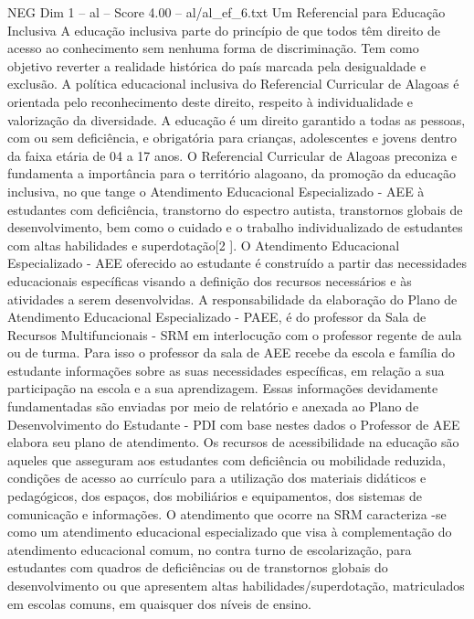 \begin{textsample}{NEG Dim 1 – al – Score 4.00 – al/al\_ef\_6.txt}  \label{ex:f1_neg_133}
Um Referencial para Educação Inclusiva A educação inclusiva parte do princípio de que todos têm direito de acesso ao conhecimento sem nenhuma forma de discriminação.
Tem como objetivo reverter a realidade histórica do país marcada pela desigualdade e exclusão.
A política educacional inclusiva do Referencial Curricular de Alagoas é orientada pelo reconhecimento deste direito, respeito à individualidade e valorização da diversidade.
A educação é um direito garantido a todas as pessoas, com ou sem deficiência, e obrigatória para crianças, adolescentes e jovens dentro da faixa etária de 04 a 17 anos.
O Referencial Curricular de Alagoas preconiza e fundamenta a importância para o território alagoano, da promoção da educação inclusiva, no que tange o Atendimento Educacional Especializado - AEE à estudantes com deficiência, transtorno do espectro autista, transtornos globais de desenvolvimento, bem como o cuidado e o trabalho individualizado de estudantes com altas habilidades e superdotação[2 ].
O Atendimento Educacional Especializado - AEE oferecido ao estudante é construído a partir das necessidades educacionais específicas visando a definição dos recursos necessários e às atividades a serem desenvolvidas.
A responsabilidade da elaboração do Plano de Atendimento Educacional Especializado - PAEE, é do professor da Sala de Recursos Multifuncionais - SRM em interlocução com o professor regente de aula ou de turma.
Para isso o professor da sala de AEE recebe da escola e família do estudante informações sobre as suas necessidades específicas, em relação a sua participação na escola e a sua aprendizagem.
Essas informações devidamente fundamentadas são enviadas por meio de relatório e anexada ao Plano de Desenvolvimento do Estudante - PDI com base nestes dados o Professor de AEE elabora seu plano de atendimento.
Os recursos de acessibilidade na educação são aqueles que asseguram aos estudantes com deficiência ou mobilidade reduzida, condições de acesso ao currículo para a utilização dos materiais didáticos e pedagógicos, dos espaços, dos mobiliários e equipamentos, dos sistemas de comunicação e informações.
O atendimento que ocorre na SRM caracteriza -se como um atendimento educacional especializado que visa à complementação do atendimento educacional comum, no contra turno de escolarização, para estudantes com quadros de deficiências ou de transtornos globais do desenvolvimento ou que apresentem altas habilidades/superdotação, matriculados em escolas comuns, em quaisquer dos níveis de ensino.

\end{textsample}
